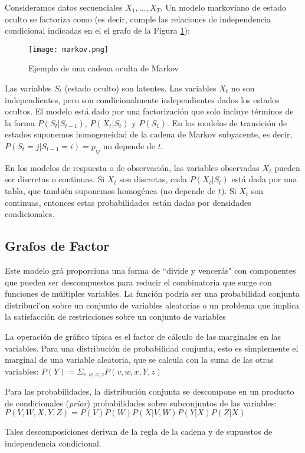 Consideramos datos secuenciales $X_1,\ldots,X_T$. Un modelo markoviano de estado oculto se factoriza como (es decir, cumple las relaciones de independencia condicional indicadas en el el grafo de la Figura \ref{fig:red2}):

\begin{figure}[h]
\caption{Ejemplo de una cadena oculta de Markov}
\centering
\texttt{[image: markov.png]}
\label{fig:red2}
\end{figure}

Las variables $S_t$ (estado oculto) son latentes. Las variables $X_t$ no son independientes, pero son condicionalmente independientes dados los estados ocultos. El modelo está dado por una factorizaci\'{o}n que solo incluye t\'{e}rminos de la forma $P(S_t|S_{t-1})$, $P(X_t|S_t)$ y $P(S_1)$. En los modelos de transición de estados suponemos homogeneidad de la cadena de Markov subyacente, es decir,
$P(S_t=j|S_{t-1}=i)=p_{ij}$ no depende de $t$.

En los modelos de respuesta o de observación, las variables observadas $X_t$ pueden ser discretas o continuas. Si $X_t$ son discretas, cada $P(X_t|S_t)$ está dada por una tabla, que tambi\'{e}n suponemos homog\'{e}nea (no depende de $t$). Si $X_t$ son continuas, entonces estas probabilidades est\'{a}n dadas por densidades condicionales.

\subsection{Grafos de Factor}
Este modelo gr\'{a} proporciona una forma de “divide y vencer\'{a}s" con
componentes que pueden ser descompuestos para reducir el
combinatoria que surge con funciones de m\'{u}ltiples
variables. La funci\'{o}n podr\'{i}a ser una probabilidad conjunta
distribuci\'{}on sobre un conjunto de variables aleatorias o un problema que implica la satisfacci\'{o}n de restricciones sobre un conjunto de variables

La operación de gráfico t\'{i}pica es el factor de
c\'{a}lculo de las marginales en las variables. Para una 
distribución de probabilidad conjunta, esto es simplemente el marginal de una
variable aleatoria, que se calcula con la suma de las otras 
variables: $P(Y)= \Sigma_{v,w,x,z}P(v,w,x,Y,z)$

Para las probabilidades,
la distribuci\'{o}n conjunta se descompone en un producto de
condicionales (\emph{prior}) probabilidades sobre subconjuntos de las
variables: $P(V,W,X,Y,Z)=P(V)P(W)P(X|V,W)P(Y|X)P(Z|X)$

Tales descomposiciones derivan de la regla de la cadena y de supuestos de independencia condicional.
